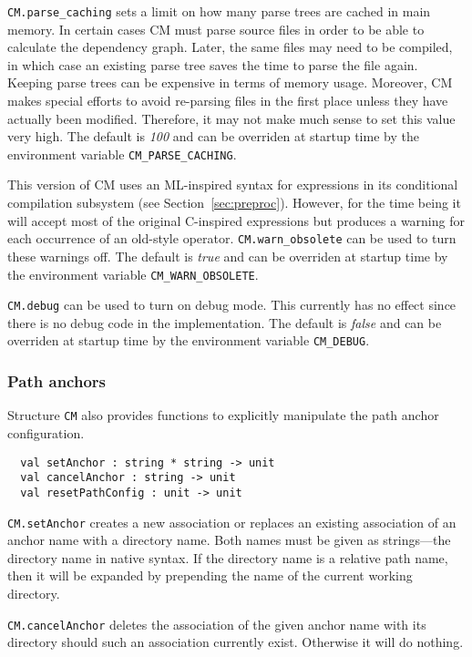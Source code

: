 \documentclass{article}
\begin{document}
{\tt CM.parse\_caching} sets a limit on how many parse trees are
cached in main memory.  In certain cases CM must parse source files in
order to be able to calculate the dependency graph.  Later, the same
files may need to be compiled, in which case an existing parse tree
saves the time to parse the file again.  Keeping parse trees can be
expensive in terms of memory usage.  Moreover, CM makes special
efforts to avoid re-parsing files in the first place unless they have
actually been modified.  Therefore, it may not make much sense to set
this value very high.  The default is {\em 100} and can be overriden
at startup time by the environment variable {\tt CM\_PARSE\_CACHING}.

This version of CM uses an ML-inspired syntax for expressions in its
conditional compilation subsystem (see Section~\ref{sec:preproc}).
However, for the time being it will accept most of the original
C-inspired expressions but produces a warning for each occurrence of
an old-style operator. {\tt CM.warn\_obsolete} can be used to turn
these warnings off. The default is {\em true} and can be overriden at
startup time by the environment variable {\tt CM\_WARN\_OBSOLETE}.

{\tt CM.debug} can be used to turn on debug mode.  This currently has
no effect since there is no debug code in the implementation. The
default is {\em false} and can be overriden at startup time by the
environment variable {\tt CM\_DEBUG}.

\subsubsection*{Path anchors}

Structure {\tt CM} also provides functions to explicitly manipulate
the path anchor configuration.

\begin{verbatim}
  val setAnchor : string * string -> unit
  val cancelAnchor : string -> unit
  val resetPathConfig : unit -> unit
\end{verbatim}

{\tt CM.setAnchor} creates a new association or replaces an existing
association of an anchor name with a directory name.  Both names must
be given as strings---the directory name in native syntax.  If the
directory name is a relative path name, then it will be expanded by
prepending the name of the current working directory.

{\tt CM.cancelAnchor} deletes the association of the given anchor name
with its directory should such an association currently exist.
Otherwise it will do nothing.
\end{document}
